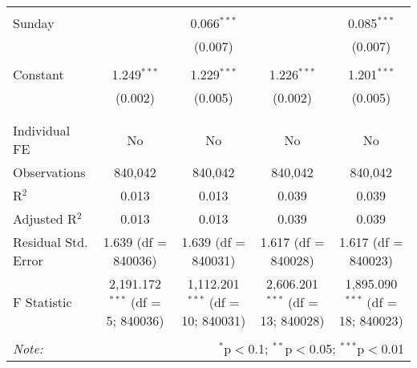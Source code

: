 \documentclass[
]{article}
\begin{document}
\begin{table}[!htbp]
{\begin{tabular}{@{\extracolsep{5pt}}lcccc}
  & & & & \\ 
 Sunday &  & 0.066$^{***}$ &  & 0.085$^{***}$ \\ 
  &  & (0.007) &  & (0.007) \\ 
  & & & & \\ 
 Constant & 1.249$^{***}$ & 1.229$^{***}$ & 1.226$^{***}$ & 1.201$^{***}$ \\ 
  & (0.002) & (0.005) & (0.002) & (0.005) \\ 
  & & & & \\ 
\hline \\[-1.8ex] 
Individual FE & No & No & No & No \\ 
Observations & 840,042 & 840,042 & 840,042 & 840,042 \\ 
R$^{2}$ & 0.013 & 0.013 & 0.039 & 0.039 \\ 
Adjusted R$^{2}$ & 0.013 & 0.013 & 0.039 & 0.039 \\ 
Residual Std. Error & 1.639 (df = 840036) & 1.639 (df = 840031) & 1.617 (df = 840028) & 1.617 (df = 840023) \\ 
F Statistic & 2,191.172$^{***}$ (df = 5; 840036) & 1,112.201$^{***}$ (df = 10; 840031) & 2,606.201$^{***}$ (df = 13; 840028) & 1,895.090$^{***}$ (df = 18; 840023) \\ 
\hline 
\hline \\[-1.8ex] 
\textit{Note:}  & \multicolumn{4}{r}{$^{*}$p$<$0.1; $^{**}$p$<$0.05; $^{***}$p$<$0.01} \\ 
\end{tabular}
} 
\end{table} 
\newpage
\end{document}
